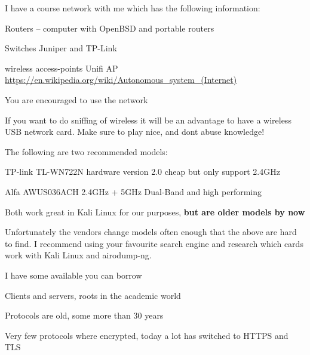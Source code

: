 \documentclass[Screen16to9,17pt]{foils}
\begin{document}
\begin{list1}
\item I have a course network with me which has the following information:
\begin{list2}
\item Routers -- computer with OpenBSD and portable routers
\item Switches Juniper and TP-Link
\item wireless access-points Unifi AP
\url{https://en.wikipedia.org/wiki/Autonomous_system_(Internet)}

\end{list2}
\end{list1}

\centerline{\Large You are encouraged to use the network}




If you want to do sniffing of wireless it will be an advantage to have a wireless USB network card. Make sure to play nice, and dont abuse knowledge!

\begin{list2}
\item The following are two recommended models:
\item TP-link TL-WN722N hardware version 2.0 cheap but only support 2.4GHz
\item Alfa AWUS036ACH 2.4GHz + 5GHz Dual-Band and high performing
\item Both work great in Kali Linux for our purposes, {\bf but are older models by now}
\end{list2}

Unfortunately the vendors change models often enough that the above are hard to find. I recommend using your favourite search engine and research which cards work with Kali Linux and airodump-ng.

I have some available you can borrow







\begin{list1}
\item Clients and servers, roots in the academic world
\item Protocols are old, some more than 30 years
\item Very few protocols where encrypted, today a lot has switched to HTTPS and TLS
\end{list1}
\end{document}
